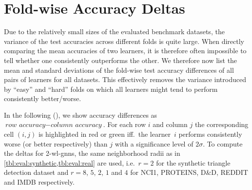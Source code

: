\section{Fold-wise Accuracy Deltas}%
\label{sec:appendix:fold-diffs}

Due to the relatively small sizes of the evaluated benchmark datasets, the variance of the test accuracies across different folds is quite large.
When directly comparing the mean accuracies of two learners, it is therefore often impossible to tell whether one consistently outperforms the other.
We therefore now list the mean and standard deviations of the fold-wise test accuracy differences of all pairs of learners for all datasets.
This effectively removes the variance introduced by ``easy'' and ``hard'' folds on which all learners might tend to perform consistently better/worse.

In the following  (), we show accuracy differences as $\textit{row accuracy} - \textit{column accuracy}$.
For each row $i$ and column $j$ the corresponding cell $(i,j)$ is highlighted in \textcolor{t_red}{red} or \textcolor{t_darkgreen}{green} iff.\ the learner~$i$ performs consistently \textcolor{t_red}{worse} (or \textcolor{t_darkgreen}{better} respectively) than $j$ with a significance level of $2\sigma$.
To compute the deltas for 2-\acs{wl}-\acsp{gnn}, the same neighborhood radii as in \cref{tbl:eval:synthetic,tbl:eval:real} are used, i.e.\ $r = 2$ for the synthetic triangle detection dataset and $r = 8$, $5$, $2$, $1$ and $4$ for NCI1, PROTEINS, D\&D, REDDIT and IMDB respectively.


